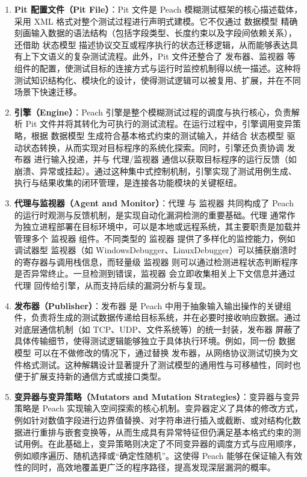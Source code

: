 \begin{enumerate}[label=\arabic*)]
    \item \textbf{Pit 配置文件（Pit File）}：Pit 文件是 Peach 模糊测试框架的核心描述载体，采用 XML 格式对整个测试过程进行声明式建模。它不仅通过 数据模型 精确刻画输入数据的语法结构（包括字段类型、长度约束以及字段间依赖关系），还借助 状态模型 描述协议交互或程序执行的状态迁移逻辑，从而能够表达具有上下文语义的复杂测试流程。此外，Pit 文件还整合了 发布器、监视器 等组件的配置，使测试目标的连接方式与运行时监控机制得以统一描述。这种将测试知识结构化、模块化的设计，使得测试逻辑可以被复用、扩展，并在不同场景下快速迁移。

    \item \textbf{引擎（Engine）}：Peach 引擎是整个模糊测试过程的调度与执行核心，负责解析 Pit 文件并将其转化为可执行的测试流程。在运行过程中，引擎调用变异策略，根据 数据模型 生成符合基本格式约束的测试输入，并结合 状态模型 驱动状态转换，从而实现对目标程序的系统化探索。同时，引擎还负责协调 发布器 进行输入投递，并与 代理/监视器 通信以获取目标程序的运行反馈（如崩溃、异常或挂起）。通过这种集中式控制机制，引擎实现了测试用例生成、执行与结果收集的闭环管理，是连接各功能模块的关键枢纽。

    \item \textbf{代理与监视器（Agent and Monitor）}：代理 与 监视器 共同构成了 Peach 的运行时观测与反馈机制，是实现自动化漏洞检测的重要基础。代理 通常作为独立进程部署在目标环境中，可以是本地或远程系统，其主要职责是加载并管理多个 监视器 组件。不同类型的 监视器 提供了多样化的监控能力，例如调试器型 监视器（如 WindowsDebugger、LinuxDebugger）可以捕获崩溃时的寄存器与调用栈信息，而轻量级 监视器 则可以通过检测进程状态判断程序是否异常终止。一旦检测到错误，监视器 会立即收集相关上下文信息并通过 代理 回传给引擎，从而支持后续的漏洞分析与复现。

    \item \textbf{发布器（Publisher）}：发布器 是 Peach 中用于抽象输入输出操作的关键组件，负责将生成的测试数据传递给目标系统，并在必要时接收响应数据。通过对底层通信机制（如 TCP、UDP、文件系统等）的统一封装，发布器 屏蔽了具体传输细节，使得测试逻辑能够独立于具体执行环境。例如，同一份 数据模型 可以在不做修改的情况下，通过替换 发布器，从网络协议测试切换为文件格式测试。这种解耦设计显著提升了测试模型的通用性与可移植性，同时也便于扩展支持新的通信方式或接口类型。

    \item \textbf{变异器与变异策略（Mutators and Mutation Strategies）}：变异器与变异策略是 Peach 实现输入空间探索的核心机制。变异器定义了具体的修改方式，例如针对数值字段进行边界值替换、对字符串进行插入或截断、或对结构化数据进行重排与嵌套变换等，从而生成具有异常特征但仍满足基本格式约束的测试用例。在此基础上，变异策略则决定了不同变异器的调度方式与应用顺序，例如顺序遍历、随机选择或``确定性随机''。这使得 Peach 能够在保证输入有效性的同时，高效地覆盖更广泛的程序路径，提高发现深层漏洞的概率。
\end{enumerate}

